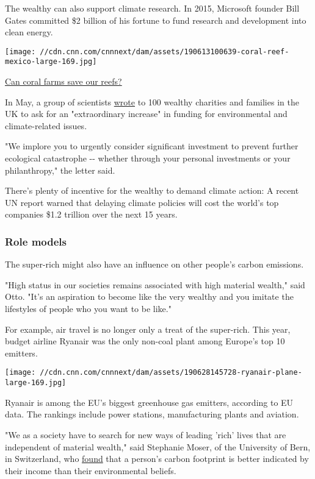 The wealthy can also support climate research. In 2015, Microsoft
founder Bill Gates committed \$2 billion of his fortune to fund research
and development into clean energy.

\href{/2019/06/13/world/land-coral-farm-reefs-climate-change-scli-intl/index.html}{}

\texttt{[image: //cdn.cnn.com/cnnnext/dam/assets/190613100639-coral-reef-mexico-large-169.jpg]}

\href{/2019/06/13/world/land-coral-farm-reefs-climate-change-scli-intl/index.html}{Can
coral farms save our reefs?}

In May, a group of scientists
\href{https://www.bbc.co.uk/news/science-environment-48357351}{wrote} to
100 wealthy charities and families in the UK to ask for an
"extraordinary increase" in funding for environmental and
climate-related issues.

"We implore you to urgently consider significant investment to prevent
further ecological catastrophe -\/- whether through your personal
investments or your philanthropy," the letter said.

There's plenty of incentive for the wealthy to demand climate action: A
recent UN report warned that delaying climate policies will cost the
world's top companies \$1.2 trillion over the next 15 years.

\hypertarget{role-models}{%
\subsubsection{Role models}\label{role-models}}

The super-rich might also have an influence on other people's carbon
emissions.

"High status in our societies remains associated with high material
wealth," said Otto. "It's an aspiration to become like the very wealthy
and you imitate the lifestyles of people who you want to be like."

For example, air travel is no longer only a treat of the super-rich.
This year, budget airline Ryanair was the only non-coal plant among
Europe's top 10 emitters.

\texttt{[image: //cdn.cnn.com/cnnnext/dam/assets/190628145728-ryanair-plane-large-169.jpg]}

Ryanair is among the EU's biggest greenhouse gas emitters, according to
EU data. The rankings include power stations, manufacturing plants and
aviation.

"We as a society have to search for new ways of leading 'rich' lives
that are independent of material wealth," said Stephanie Moser, of the
University of Bern, in Switzerland, who
\href{https://journals.sagepub.com/doi/abs/10.1177/0013916517710685}{found}
that a person's carbon footprint is better indicated by their income
than their environmental beliefs.

